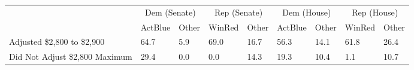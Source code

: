 \begin{tabular}{lll|ll|ll|ll}
  & \multicolumn{2}{c}{Dem (Senate)}& \multicolumn{2}{c}{Rep (Senate)}& \multicolumn{2}{c}{Dem (House)}& \multicolumn{2}{c}{Rep (House)}\\  & ActBlue & Other & WinRed & Other & ActBlue & Other & WinRed & Other \\ 
  \midrule
Adjusted \$2,800 to \$2,900 & 64.7 & 5.9 & 69.0 & 16.7 & 56.3 & 14.1 & 61.8 & 26.4 \\ 
  Did Not Adjust \$2,800 Maximum & 29.4 & 0.0 & 0.0 & 14.3 & 19.3 & 10.4 & 1.1 & 10.7 \\ 
  \end{tabular}
